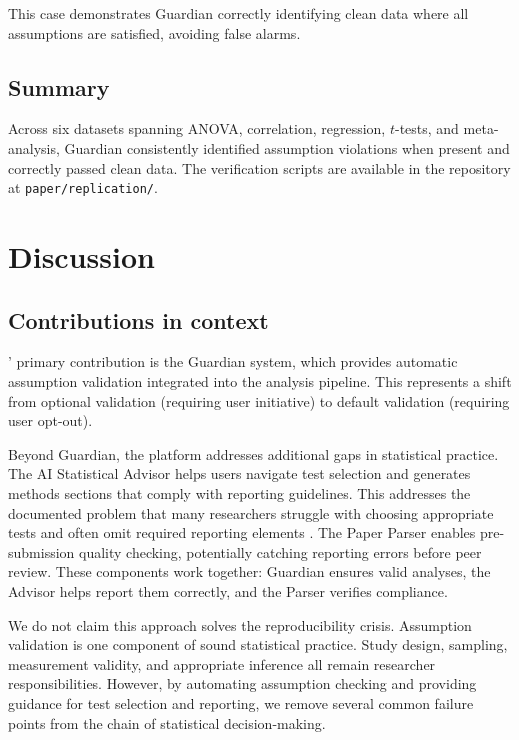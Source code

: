 \documentclass[article]{jss}
\begin{document}
This case demonstrates Guardian correctly identifying clean data where all assumptions are satisfied, avoiding false alarms.

\subsection{Summary}

Across six datasets spanning ANOVA, correlation, regression, $t$-tests, and meta-analysis, Guardian consistently identified assumption violations when present and correctly passed clean data. The verification scripts are available in the repository at \texttt{paper/replication/}.


\section{Discussion} \label{sec:discussion}

\subsection{Contributions in context}

' primary contribution is the Guardian system, which provides automatic assumption validation integrated into the analysis pipeline. This represents a shift from optional validation (requiring user initiative) to default validation (requiring user opt-out).

Beyond Guardian, the platform addresses additional gaps in statistical practice. The AI Statistical Advisor helps users navigate test selection and generates methods sections that comply with reporting guidelines. This addresses the documented problem that many researchers struggle with choosing appropriate tests and often omit required reporting elements \citep{appelbaum2018jars}. The Paper Parser enables pre-submission quality checking, potentially catching reporting errors before peer review. These components work together: Guardian ensures valid analyses, the Advisor helps report them correctly, and the Parser verifies compliance.

We do not claim this approach solves the reproducibility crisis. Assumption validation is one component of sound statistical practice. Study design, sampling, measurement validity, and appropriate inference all remain researcher responsibilities. However, by automating assumption checking and providing guidance for test selection and reporting, we remove several common failure points from the chain of statistical decision-making.
\end{document}
